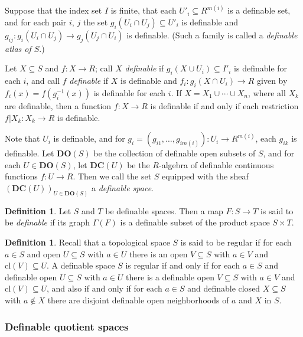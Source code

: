 \documentclass{amsart}
\theoremstyle{definition}
\newtheorem{definition}[theorem]{Definition}
\numberwithin{equation}{section}
\begin{document}
Suppose that the index set $I$ is finite,
that each $U'_i \subseteq R^{m(i)}$ is a definable set,
and for each pair $i$, $j$ the set $g_i(U_i\cap U_j) \subseteq U'_i$
is definable and $g_{ij}: g_i(U_i\cap U_j) \to g_j(U_j\cap U_i)$ is definable.
(Such a family is called a \emph{definable atlas of $S$}.)

Let $X \subseteq S$ and $f : X \to R$;
call $X$ \emph{definable} if $g_i(X\cup U_i) \subseteq I'_i$ is definable for each $i$,
and call $f$ \emph{definable} if $X$ is definable and
$f_i : g_i(X \cap U_i) \to R$ given by $f_i(x) = f(g_i^{-1}(x))$ is definable for each $i$.
If $X = X_1\cup \cdots \cup X_n$,
where all $X_k$ are definable,
then a function $f: X \to R$ is definable if and only if each restriction $f|X_k: X_k \to R$ is definable.

Note that $U_i$ is definable,
and for $g_i = (g_{i1},\dots,g_{im(i)}) : U_i \to R^{m(i)}$,
each $g_{ik}$ is definable.
Let $\mathbf{DO}(S)$ be the collection of definable open subsets of $S$,
and for each $U \in \mathbf{DO}(S)$,
let $\mathbf{DC}(U)$ be the $R$-algebra of definable continuous functions $f: U \to R$.
Then we call the set $S$ equipped with the sheaf $(\mathbf{DC}(U))_{U \in \mathbf{DO}(S)}$ a \emph{definable space}.

\begin{definition}
  Let $S$ and $T$ be definable spaces.
  Then a map $F: S \to T$ is said to be \emph{definable} if its graph $\Gamma(F)$ is a definable subset of
  the product space $S \times T$.
\end{definition}

\begin{definition}
  Recall that a topological space $S$ is said to be regular if for each $a \in  S$ and
  open $U \subseteq S$ with $a \in U$ there is an open $V \subseteq S$ with $a \in V$ and $\mathrm{cl}(V) \subseteq U$.
  A definable space $S$ is regular if and only if for each $a \in S$ and definable open $U \subseteq S$ with $a \in U$
  there is a definable open $V \subseteq S$ with $a \in V$ and $\mathrm{cl}(V) \subseteq U$,
  and also if and only if for each $a \in S$ and definable closed $X \subseteq S$ with $a \notin X$
  there are disjoint definable open neighborhoods of $a$ and $X$ in $S$.
\end{definition}

\subsubsection{Definable quotient spaces}
\end{document}
